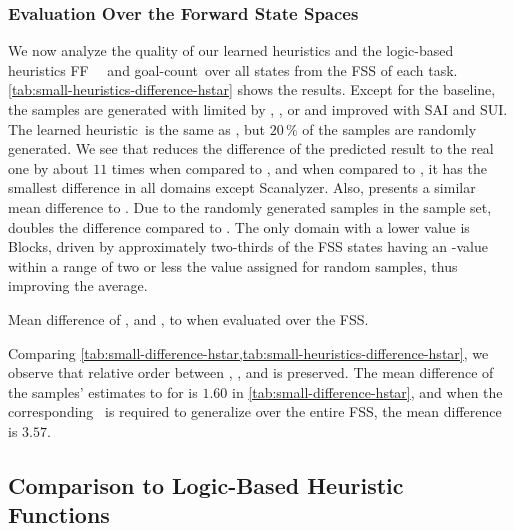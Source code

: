 \subsubsection{Evaluation Over the Forward State Spaces}
\label{sec:small-exps-hvalue-fss}

We now analyze the quality of our learned heuristics and the logic-based heuristics FF~\hff~\cite{hoffmann2001ff} and goal-count~\hgc over all states from the FSS of each task. \cref{tab:small-heuristics-difference-hstar} shows the results. Except for the baseline, the samples are generated with \bfsrw limited by \rldefault, \rlfacts, or \rlmeanfx and improved with SAI and SUI. The learned heuristic~\hnnrs is the same as \hnnl{\rlmeanfx}, but $20\,\%$ of the samples are randomly generated. We see that \hnnl{\rlmeanfx} reduces the difference of the predicted result to the real one by about $11$ times when compared to \hnnbase, and when compared to \hgc, it has the smallest difference in all domains except Scanalyzer. Also, \hnnl{\rlmeanfx} presents a similar mean difference to \hff. Due to the randomly generated samples in the sample set, \hnnrs doubles the difference compared to \hnnl{\rlmeanfx}. The only domain with a lower value is Blocks, driven by approximately two-thirds of the FSS states having an \hstar-value within a range of two or less the value assigned for random samples, thus improving the average.

\begin{table}[tb]
    \caption[Mean difference of heuristics to \hstar when evaluated over the FSS.]{Mean difference of \hff, \hgc and \hnn, to \hstar when evaluated over the FSS.}
    \label{tab:small-heuristics-difference-hstar}
    \addmargin
    \centering
    
\end{table}

Comparing \cref{tab:small-difference-hstar,tab:small-heuristics-difference-hstar}, we observe that relative order between \rldefault, \rlfacts, and \rlmeanfx is preserved. The mean difference of the samples' estimates to \hstar for \rlmeanfx is $1.60$ in \cref{tab:small-difference-hstar}, and when the corresponding~\hnnl{\rlmeanfx} is required to generalize over the entire FSS, the mean difference is $3.57$.

\subsection{Comparison to Logic-Based Heuristic Functions}
\label{sec:small-exps-hvalue-comparison}

